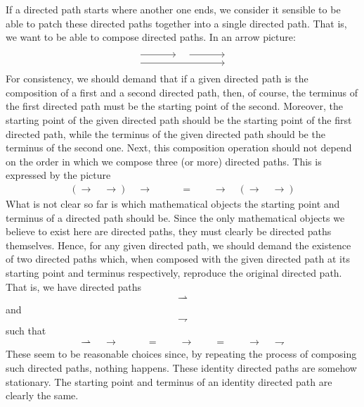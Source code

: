If a directed path starts where another one ends, we consider it sensible to be able to patch these directed paths together into a single directed path.
That is, we want to be able to compose directed paths.
In an arrow picture:
\[
\begin{tikzcd}[sep=large]
  \phantom{1}
  \arrow[shift left=1ex]{r}{}
  \arrow[shift right=1ex]{rr}{}
  &
  \phantom{1}
  \arrow[shift left=1ex]{r}{}
  &
  \phantom{1}
\end{tikzcd}
\]
For consistency, we should demand that if a given directed path is the composition of a first and a second directed path, then, of course, the terminus of the first directed path must be the starting point of the second.
Moreover, the starting point of the given directed path should be the starting point of the first directed path, while the terminus of the given directed path should be the terminus of the second one.
Next, this composition operation should not depend on the order in which we compose three (or more) directed paths.
This is expressed by the picture
\begin{align*}
  \left(
    \longrightarrow
    \quad
    \longrightarrow
  \right)
  \quad
  \longrightarrow
  \qquad
  &=
  \qquad
  \longrightarrow
  \quad
  \left(
    \longrightarrow
    \quad
    \longrightarrow
  \right)
\end{align*}
What is not clear so far is which mathematical objects the starting point and terminus of a directed path should be.
Since the only mathematical objects we believe to exist here are directed paths, they must clearly be directed paths themselves.
Hence, for any given directed path, we should demand the existence of two directed paths which, when composed with the given directed path at its starting point and terminus respectively, reproduce the original directed path.
That is, we have directed paths
\begin{align*}
  \rightharpoonup
\end{align*}
and
\begin{align*}
  \rightharpoondown
\end{align*}
such that
\begin{align*}
  \rightharpoonup
  \quad
  \longrightarrow
  \qquad
  &=
  \qquad
  \longrightarrow  
  \qquad
  =
  \qquad
  \longrightarrow
  \quad
  \rightharpoondown
\end{align*}
These seem to be reasonable choices since, by repeating the process of composing such directed paths, nothing happens.
These identity directed paths are somehow stationary.
The starting point and terminus of an identity directed path are clearly the same.
